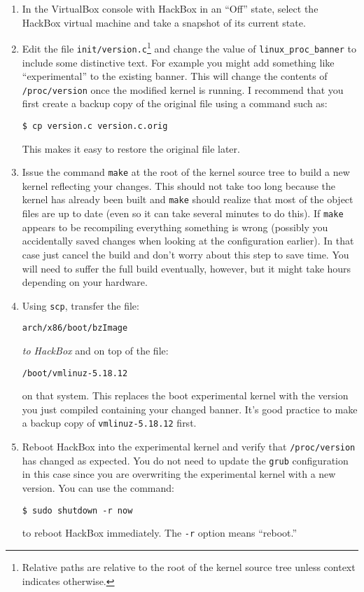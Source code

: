 \documentclass[twocolumn]{article}
\newcommand{\command}[1]{\texttt{#1}}
\begin{document}
\begin{enumerate}

\item In the VirtualBox console with HackBox in an ``Off'' state, select the HackBox virtual
  machine and take a snapshot of its current state.

\item Edit the file \texttt{init/version.c}\footnote{Relative paths are relative to the root of
    the kernel source tree unless context indicates otherwise.} and change the value of
  \texttt{linux\_proc\_banner} to include some distinctive text. For example you might add
  something like ``experimental'' to the existing banner. This will change the contents of
  \texttt{/proc/version} once the modified kernel is running. I recommend that you first create
  a backup copy of the original file using a command such as:
\begin{verbatim}
$ cp version.c version.c.orig
\end{verbatim}

  This makes it easy to restore the original file later.

\item Issue the command \texttt{make} at the root of the kernel source tree to build a new
  kernel reflecting your changes. This should not take too long because the kernel has already
  been built and \texttt{make} should realize that most of the object files are up to date (even
  so it can take several minutes to do this). If \texttt{make} appears to be recompiling
  everything something is wrong (possibly you accidentally saved changes when looking at the
  configuration earlier). In that case just cancel the build and don't worry about this step to
  save time. You will need to suffer the full build eventually, however, but it might take hours
  depending on your hardware.

\item Using \command{scp}, transfer the file:
\begin{Verbatim}
arch/x86/boot/bzImage
\end{Verbatim}
  \emph{to HackBox} and on top of the file:
\begin{Verbatim}
/boot/vmlinuz-5.18.12
\end{Verbatim}
  on that system. This replaces the boot experimental kernel with the version you just compiled
  containing your changed banner. It's good practice to make a backup copy of
  \texttt{vmlinuz-5.18.12} first.

\item Reboot HackBox into the experimental kernel and verify that \texttt{/proc/version} has
  changed as expected. You do not need to update the \command{grub} configuration in this case
  since you are overwriting the experimental kernel with a new version. You can use the command:
\begin{Verbatim}
$ sudo shutdown -r now
\end{Verbatim}
  to reboot HackBox immediately. The \texttt{-r} option means ``reboot.''

\end{enumerate}
\end{document}
